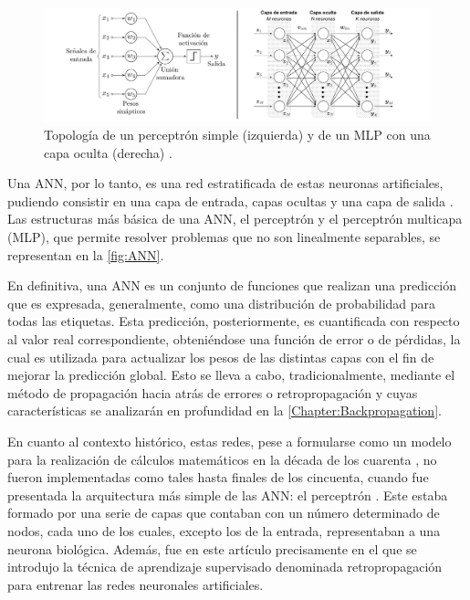 \begin{figure}
    \centering
    \includegraphics[width=\textwidth]{Images/perceptron_MLP.png}
    \caption{Topología de un perceptrón simple (izquierda) \cite{img:perceptron} y de un MLP con una capa oculta (derecha) \cite{img:MLP}.}
    \label{fig:ANN}
\end{figure}

Una ANN, por lo tanto, es una red estratificada de estas neuronas artificiales, pudiendo consistir en una capa de entrada, capas ocultas y una capa de salida \cite{Engelbrecht}. Las estructuras más básica de una ANN, el perceptrón y el perceptrón multicapa (MLP), que permite resolver problemas que no son linealmente separables, se representan en la \autoref{fig:ANN}.

En definitiva, una ANN es un conjunto de funciones que realizan una predicción que es expresada, generalmente, como una distribución de probabilidad para todas las etiquetas. Esta predicción, posteriormente, es cuantificada con respecto al valor real correspondiente, obteniéndose una función de error o de pérdidas, la cual es utilizada para actualizar los pesos de las distintas capas con el fin de mejorar la predicción global. Esto se lleva a cabo, tradicionalmente, mediante el método de propagación hacia atrás de errores o retropropagación y cuyas características se analizarán en profundidad en la \autoref{Chapter:Backpropagation}.

En cuanto al contexto histórico, estas redes, pese a formularse como un modelo para la realización de cálculos matemáticos en la década de los cuarenta \cite{McCulloch}, no fueron implementadas como tales hasta finales de los cincuenta, cuando fue presentada la arquitectura más simple de las ANN: el perceptrón \cite{Rosenblatt}. Este estaba formado por una serie de capas que contaban con un número determinado de nodos, cada uno de los cuales, excepto los de la entrada, representaban a una neurona biológica.
Además, fue en este artículo precisamente en el que se introdujo la técnica de aprendizaje supervisado denominada retropropagación para entrenar las redes neuronales artificiales. 

